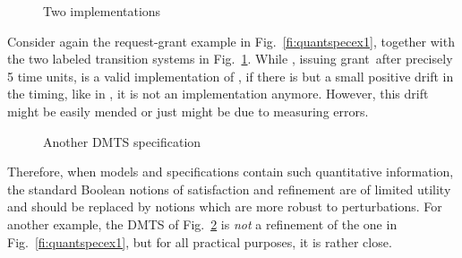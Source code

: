 \documentclass[twocolumn]{svjour3-dummy}
\newcommand*\grant{\textsf{grant}}
\begin{document}
\begin{figure}
  \centering
  \caption{\label{fi:quantimp1}
    Two implementations}
\end{figure}

Consider again the request-grant example in Fig.~\ref{fi:quantspecex1},
together with the two labeled transition systems in
Fig.~\ref{fi:quantimp1}.  While , issuing \grant\ after precisely 5
time units, is a valid implementation of , if there is but a small
positive drift in the timing, like in , it is not an implementation
anymore.  However, this drift might be easily mended or just might be
due to measuring errors.

\begin{figure}\centering
  \caption{\label{fi:quantimp}
    Another DMTS specification}
\end{figure}

Therefore, when models and specifications contain such quantitative
information, the standard Boolean notions of satisfaction and refinement
are of limited utility~\cite{DBLP:conf/fm/HenzingerS06,
  DBLP:journals/cejcs/Sifakis11} and should be replaced by notions which
are more robust to perturbations.  For another example, the DMTS of
Fig.~\ref{fi:quantimp} is \emph{not} a refinement of the one in
Fig.~\ref{fi:quantspecex1}, but for all practical purposes, it is rather
close.
\end{document}
